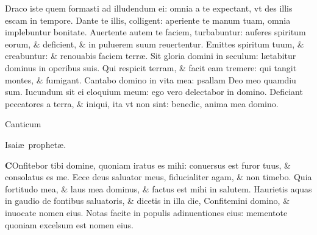 \documentclass[a5paper,10pt]{book}
\def\leftmarginnote{%
	\lrmarginnote{\hskip -\marginparsep \hskip -6.5em}}
\def\ae{æ}
\begin{document}
\begin{multicols*}{2}
\newline \color{red} D\color{black}raco iste quem formasti ad illudendum ei: omnia a te expectant, vt des illis escam in tempore.
\newline \color{red} D\color{black}ante te illis, colligent: aperiente te manum tuam, omnia implebuntur bonitate.
\newline \color{red} A\color{black}uertente autem te faciem, turbabuntur: auferes spiritum eorum, \& deficient, \& in puluerem suum reuertentur.
\newline \color{red} E\color{black}mittes spiritum tuum, \& creabuntur: \& renouabis faciem terr\ae .
\newline \color{red} S\color{black}it gloria domini in seculum: l\ae tabitur dominus in operibus suis.
\newline \color{red} Q\color{black}ui respicit terram, \& facit eam tremere: qui tangit montes, \& fumigant.
\newline \color{red} C\color{black}antabo domino in vita mea: psallam Deo meo quamdiu sum.
\newline \color{red} I\color{black}ucundum sit ei eloquium meum: ego vero delectabor in domino.
\newline \color{red} D\color{black}eficiant peccatores a terra, \& iniqui, ita vt non sint: benedic, anima mea domino.
\vspace{-1em}
\begin{center} \color{red}
\hypertarget{Isaiah}{Canticum} Isai\ae \ prophet\ae .
\end{center}
\vspace{-1em}
\lettrine[lines=2]{\bfseries \color{red} C}{}Onfitebor tibi domine, quoniam iratus es mihi:\leftmarginnote{\begin{flushright}Isa.\\12.\end{flushright}} conuersus est furor tuus, \& consolatus es me.
\newline \color{red} E\color{black}cce deus saluator meus, fiducialiter agam, \& non timebo.
\newline \color{red} Q\color{black}uia fortitudo mea, \& laus mea dominus, \& factus est mihi in salutem.
\newline \color{red} H\color{black}aurietis aquas in gaudio de fontibus saluatoris, \& dicetis in illa die, Confitemini domino, \& inuocate nomen eius.%
\newline \color{red} N\color{black}otas facite in populis adinuentiones eius: mementote quoniam excelsum est nomen eius.

\end{multicols*}
\end{document}
